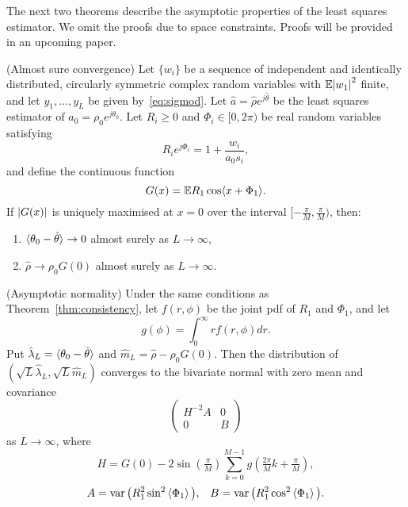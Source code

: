 \documentclass[conference]{IEEEtran}
\begin{document}
The next two theorems describe the asymptotic properties of the least squares estimator.  We omit the proofs due to space constraints.  Proofs will be provided in an upcoming paper.

\begin{theorem}\label{thm:consistency} (Almost sure convergence)
Let $\{w_i\}$ be a sequence of independent and identically distributed, circularly symmetric complex random variables with ${\mathbb E} {\left\vert w_1 \right\vert}^2$ finite, and let $y_1,\dots, y_L$ be given by~\eqref{eq:sigmod}.   Let $\hat{a} = \hat{\rho}e^{j\hat{\theta}}$ be the least squares estimator of $a_0 = \rho_0e^{j\theta_0}$.  Let $R_i \geq 0$ and $\Phi_i \in [0,2\pi)$ be real random variables satisfying
\begin{equation}\label{eq:RiandPhii}
R_ie^{j\Phi_i} = 1 + \frac{w_i}{a_0 s_i},
\end{equation}
and define the continuous function
\[
G(x) = {\mathbb E} R_1 \cos\langle  x + \Phi_1 \rangle.
\] 
If ${\left\vert G(x) \right\vert}$ is uniquely maximised at $x = 0$ over the interval $[-\tfrac{\pi}{M},\tfrac{\pi}{M})$, then:
\begin{enumerate}
\item $\langle \theta_0 - \hat{\theta} \rangle \rightarrow 0$ almost surely as $L \rightarrow \infty$,
\item $\hat{\rho} \rightarrow \rho_0 G(0)$ almost surely as $L \rightarrow \infty$.
\end{enumerate}
\end{theorem}

\begin{theorem}\label{thm:normality} (Asymptotic normality)
Under the same conditions as Theorem~\ref{thm:consistency}, let $f(r,\phi)$ be the joint pdf of $R_1$ and $\Phi_1$, and let
\[
g(\phi) = \int_{0}^{\infty} r f(r,\phi) dr.
\]
Put $\hat{\lambda}_L = \langle \theta_0 - \hat{\theta} \rangle$ and $\hat{m}_L = \hat{\rho} - \rho_0 G(0)$. %
Then the distribution of $(\sqrt{L}\hat{\lambda}_L, \sqrt{L}\hat{m}_L)$ converges to the bivariate normal with zero mean and covariance
\[
\left( \begin{array}{cc} 
H^{-2} A & 0 \\
0 & B
\end{array} \right)
\]
as $L \rightarrow \infty$, where
\[
H = G(0) -  2 \sin(\tfrac{\pi}{M}) \sum_{k = 0}^{M-1} g(\tfrac{2\pi}{M}k + \tfrac{\pi}{M}),
\]
\[
A = \operatorname{var}\big( R_1^2\sin^2\left\langle \Phi_1 \right\rangle\big), \;\;\; B = \operatorname{var}\big( R_1^2 \cos^2\left\langle \Phi_1 \right\rangle \big). 
\]
\end{theorem}
\end{document}
